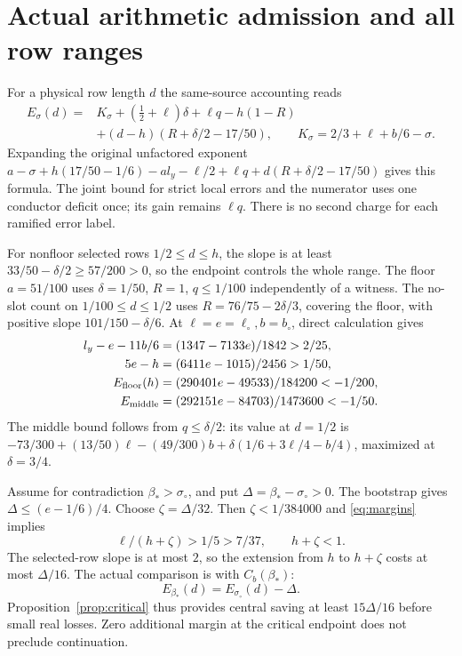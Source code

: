\documentclass[11pt,a4paper]{article}
\theoremstyle{definition}
\newcommand{\sig}{\sigma_\circ}
\newcommand{\bet}{\beta_*}
\begin{document}
\section{Actual arithmetic admission and all row ranges}
\label{sec:admission}
For a physical row length $d$ the same-source accounting reads
\begin{equation}\label{eq:generalE}
 \begin{split}
 E_\sigma(d)={}&K_\sigma+(\tfrac12+\ell)\delta+\ell q
       -h(1-R)\\
       &+(d-h)(R+\delta/2-17/50),\qquad
 K_\sigma=2/3+\ell+b/6-\sigma .
 \end{split}
\end{equation}
Expanding the original unfactored exponent
$a-\sigma+h(17/50-1/6)-a l_y-\ell/2+\ell q
+d(R+\delta/2-17/50)$ gives this formula.
The joint bound for strict local errors and the numerator uses
one conductor deficit once; its gain remains $\ell q$.
There is no second charge for each ramified error label.

For nonfloor selected rows $1/2\le d\le h$, the slope is at least
$33/50-\delta/2\ge57/200>0$, so the endpoint controls the whole range.
The floor $a=51/100$ uses $\delta=1/50$, $R=1$, $q\le1/100$
independently of a witness.
The no-slot count on $1/100\le d\le1/2$ uses
$R=76/75-2\delta/3$, covering the floor, with positive slope
$101/150-\delta/6$.
At $\ell=e=\ell_\circ,b=b_\circ$, direct calculation gives
\begin{align}
 l_y-e-11b/6&=(1347-7133e)/1842>2/25,\notag\\
 5e-h&=(6411e-1015)/2456>1/50,\label{eq:margins}\\
 E_{\mathrm{floor}}(h)&=(290401e-49533)/184200<-1/200,\notag\\
 E_{\mathrm{middle}}&=(292151e-84703)/1473600<-1/50.\notag
\end{align}
The middle bound follows from $q\le\delta/2$:
its value at $d=1/2$ is
$-73/300+(13/50)\ell-(49/300)b
+\delta(1/6+3\ell/4-b/4)$,
maximized at $\delta=3/4$.

Assume for contradiction $\bet>\sig$, and put
$\Delta=\bet-\sig>0$. The bootstrap gives
$\Delta\le(e-1/6)/4$. Choose $\zeta=\Delta/32$.
Then $\zeta<1/384000$ and \eqref{eq:margins} implies
\[
 \ell/(h+\zeta)>1/5>7/37,\qquad h+\zeta<1.
\]
The selected-row slope is at most $2$, so the extension from $h$
to $h+\zeta$ costs at most $\Delta/16$.
The actual comparison is with $C_b(\bet)$:
\begin{equation}\label{eq:Delta}
 E_{\bet}(d)=E_{\sig}(d)-\Delta.
\end{equation}
Proposition~\ref{prop:critical} thus provides central saving at
least $15\Delta/16$ before small real losses.
Zero additional margin at the critical endpoint does not preclude
continuation.
\end{document}
